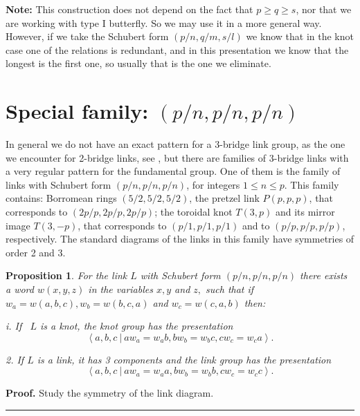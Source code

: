 \documentclass[12pt]{article}%
\newtheorem{proposition}[theorem]{Proposition}
\newenvironment{proof}[1][Proof]{\noindent\textbf{#1.} }{\ \rule{0.5em}{0.5em}}
\begin{document}
\textbf{Note:} This construction does not depend on the fact that $p\geq q\geq
s$, nor that we are working with type I butterfly. So we may use it in a more
general way. However, if we take the Schubert form $\left(
p/n,q/m,s/l\right)  $ we know that in the knot case one of the relations is
redundant, and in this presentation we know that the longest is the first one,
so usually that is the one we eliminate.

\section{Special family: $(p/n,p/n,p/n)$}

In general we do not have an exact pattern for a 3-bridge link group, as the
one we encounter for 2-bridge links, see \cite{Mur}, but there are families of
3-bridge links with a very regular pattern for the fundamental group. One of
them is the family of links with Schubert form $(p/n,p/n,p/n)$, for integers
$1\leq n\leq p$. This family contains: Borromean rings $\left(
5/2,5/2,5/2\right)  $, the pretzel link $P\left(  p,p,p\right)  $, that
corresponds to $\left(  2p/p,2p/p,2p/p\right)  $; the toroidal knot $T\left(
3,p\right)  $ and its mirror image $T\left(  3,-p\right)  $, that corresponds
to $(p/1,p/1,p/1)$ and to $(p/p,p/p,p/p)$, respectively. The standard diagrams
of the links in this family have symmetries of order 2 and 3.

\begin{proposition}
\label{proppalw}For the link $L$ with Schubert form $(p/n,p/n,p/n)$ there
exists a word $w\left(  x,y,z\right)  $ in the variables $x,y$ and $z,$ such
that if $w_{a}=w\left(  a,b,c\right)  ,w_{b}=w\left(  b,c,a\right)  $ and
$w_{c}=w\left(  c,a,b\right)  $ then:

i. If ~$L$ is a knot, the knot group has the presentation
\[
\left\langle a,b,c\ |\ aw_{a}=w_{a}b,bw_{b}=w_{b}c,cw_{c}=w_{c}a\right\rangle
\text{.}%
\]


2. If $L$ is a link, it has 3 components and the link group has the
presentation
\[
\left\langle a,b,c\ |\ aw_{a}=w_{a}a,bw_{b}=w_{b}b,cw_{c}=w_{c}c\right\rangle
\text{.}%
\]

\end{proposition}

\begin{proof}
Study the symmetry of the link diagram.
\end{proof}
\end{document}
